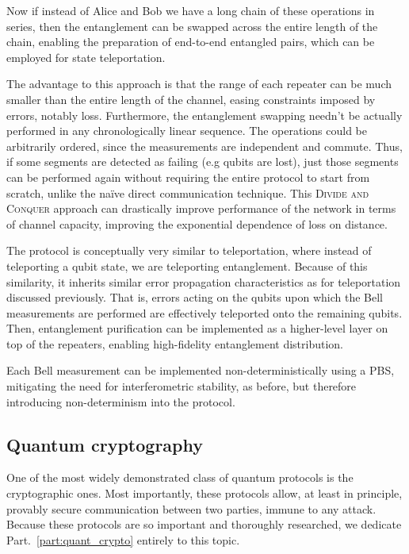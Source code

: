 Now if instead of Alice and Bob we have a long chain of these operations in series, then the entanglement can be swapped across the entire length of the chain, enabling the preparation of end-to-end entangled pairs, which can be employed for state teleportation.

The advantage to this approach is that the range of each repeater can be much smaller than the entire length of the channel, easing constraints imposed by errors, notably loss. Furthermore, the entanglement swapping needn't be actually performed in any chronologically linear sequence. The operations could be arbitrarily ordered, since the measurements are independent and commute. Thus, if some segments are detected as failing (e.g qubits are lost), just those segments can be performed again without requiring the entire protocol to start from scratch, unlike the na{\" i}ve direct communication technique. This \textsc{Divide and Conquer} approach can drastically improve performance of the network in terms of channel capacity, improving the exponential dependence of loss on distance. 

The protocol is conceptually very similar to teleportation, where instead of teleporting a qubit state, we are teleporting entanglement. Because of this similarity, it inherits similar error propagation characteristics as for teleportation discussed previously. That is, errors acting on the qubits upon which the Bell measurements are performed are effectively teleported onto the remaining qubits. Then, entanglement purification can be implemented as a higher-level layer on top of the repeaters, enabling high-fidelity entanglement distribution.

Each Bell measurement can be implemented non-deterministically using a PBS, mitigating the need for interferometric stability, as before, but therefore introducing non-determinism into the protocol.

%
%

\subsection{Quantum cryptography}\label{sec:QKD_prot}

One of the most widely demonstrated class of quantum protocols is the cryptographic ones. Most importantly, these protocols allow, at least in principle, provably secure communication between two parties, immune to any attack. Because these protocols are so important and thoroughly researched, we dedicate  Part.~\ref{part:quant_crypto} entirely to this topic.

